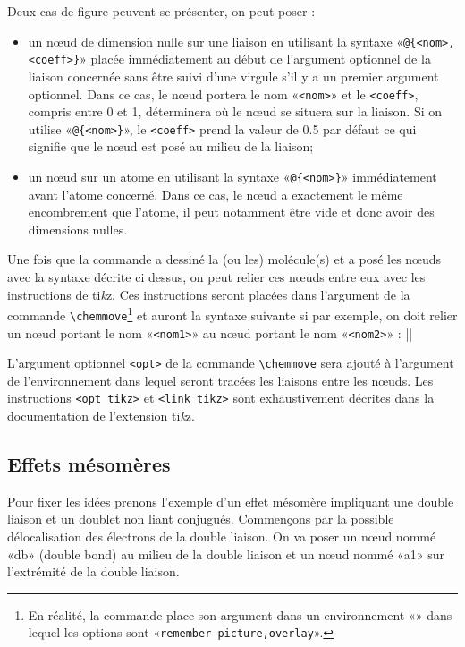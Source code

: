 \documentclass[10pt,french]{article}
\newcommand\falseverb[1]{{\ttfamily\detokenize\expandafter{\string#1}}}
\newcommand\TIKZ{ti\textit kz\xspace}
\begin{document}
Deux cas de figure peuvent se présenter, on peut poser :
\begin{itemize}
	\item un nœud de dimension nulle sur une liaison en utilisant la syntaxe «\verb-@{<nom>,<coeff>}-» placée immédiatement au début de l'argument optionnel de la liaison concernée sans être suivi d'une virgule s'il y a un premier argument optionnel. Dans ce cas, le nœud portera le nom «\verb-<nom>-» et le \verb-<coeff>-, compris entre 0 et 1, déterminera où le nœud se situera sur la liaison. Si on utilise «\verb-@{<nom>}-», le \verb-<coeff>- prend la valeur de 0.5 par défaut ce qui signifie que le nœud est posé au milieu de la liaison;
	\item un nœud sur un atome en utilisant la syntaxe «\verb-@{<nom>}-» immédiatement avant l'atome concerné. Dans ce cas, le nœud a exactement le même encombrement que l'atome, il peut notamment être vide et donc avoir des dimensions nulles.
\end{itemize}
Une fois que la commande \falseverb{\chemfig} a dessiné la (ou les) molécule(s) et a posé les nœuds avec la syntaxe décrite ci dessus, on peut relier ces nœuds entre eux avec les instructions de \TIKZ. Ces instructions seront placées dans l'argument de la commande \verb-\chemmove-\footnote{En réalité, la commande \texttt{\string\chemmove} place son argument dans un environnement «\falseverb{tikzpicture}» dans lequel les options sont «\texttt{remember picture,overlay}».} et auront la syntaxe suivante si par exemple, on doit relier un nœud portant le nom «\verb-<nom1>-» au nœud portant le nom «\verb-<nom2>-» :
\centerverb||
\smallskip

L'argument optionnel \verb-<opt>- de la commande \verb-\chemmove- sera ajouté à l'argument de l'environnement \falseverb{tikzpicture} dans lequel seront tracées les liaisons entre les nœuds. Les instructions \verb-<opt tikz>- et \verb-<link tikz>- sont exhaustivement décrites dans la documentation de l'extension \TIKZ.

\subsection{Effets mésomères}
Pour fixer les idées prenons l'exemple d'un effet mésomère impliquant une double liaison et un doublet non liant conjugués. Commençons par la possible délocalisation des électrons de la double liaison. On va poser un nœud nommé «db» (double bond) au milieu de la double liaison et un nœud nommé «a1» sur l'extrémité de la double liaison.
\end{document}
